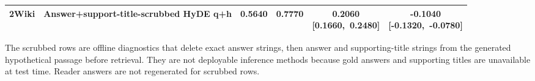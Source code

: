 \begin{table}[htbp]
\begin{tabularx}{\textwidth}{@{}l>{\raggedright\arraybackslash}Xrrcc@{}}
2Wiki & Answer+support-title-scrubbed HyDE q+h & 0.5640 & 0.7770 & \shortstack{0.2060\\\mbox{[0.1660, 0.2480]}} & \shortstack{-0.1040\\\mbox{[-0.1320, -0.0780]}} \\
\bottomrule
\end{tabularx}
\begin{tablenotes}
\footnotesize
\item The scrubbed rows are offline diagnostics that delete exact answer strings, then answer and supporting-title strings from the generated hypothetical passage before retrieval. They are not deployable inference methods because gold answers and supporting titles are unavailable at test time. Reader answers are not regenerated for scrubbed rows.
\end{tablenotes}
\end{table}
